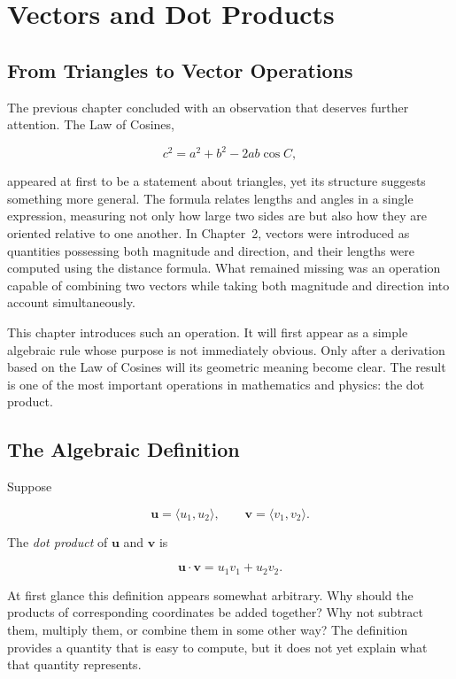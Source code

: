 \chapter{Vectors and Dot Products}
\label{ch:ch13-vectors-dot-products}

\section{From Triangles to Vector Operations}

The previous chapter concluded with an observation that deserves further
attention. The Law of Cosines,

\[
c^2=a^2+b^2-2ab\cos C,
\]

appeared at first to be a statement about triangles, yet its structure
suggests something more general. The formula relates lengths and angles in
a single expression, measuring not only how large two sides are but also
how they are oriented relative to one another. In Chapter~2, vectors were
introduced as quantities possessing both magnitude and direction, and
their lengths were computed using the distance formula. What remained
missing was an operation capable of combining two vectors while taking
both magnitude and direction into account simultaneously.

This chapter introduces such an operation. It will first appear as a
simple algebraic rule whose purpose is not immediately obvious. Only after
a derivation based on the Law of Cosines will its geometric meaning become
clear. The result is one of the most important operations in mathematics
and physics: the dot product.

\section{The Algebraic Definition}

Suppose

\[
\mathbf{u}=\langle u_1,u_2\rangle,
\qquad
\mathbf{v}=\langle v_1,v_2\rangle.
\]

\begin{definition}
The \emph{dot product} of $\mathbf{u}$ and $\mathbf{v}$ is

\[
\mathbf{u}\cdot\mathbf{v}
=
u_1v_1+u_2v_2.
\]
\end{definition}

At first glance this definition appears somewhat arbitrary. Why should the
products of corresponding coordinates be added together? Why not subtract
them, multiply them, or combine them in some other way? The definition
provides a quantity that is easy to compute, but it does not yet explain
what that quantity represents.

